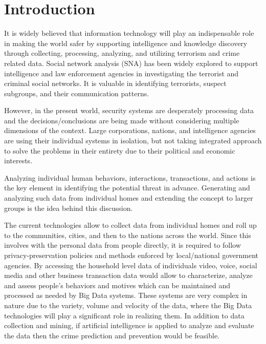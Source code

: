 \documentclass[sigconf]{acmart}
\begin{document}

\maketitle

\section{Introduction}
It is widely believed that information technology will play an indispensable role in making the world safer by supporting intelligence and knowledge discovery through collecting, processing, analyzing, and utilizing terrorism and crime related data\cite{Kantor2005}. Social network analysis (SNA) has been widely explored to support intelligence and law enforcement agencies in investigating the terrorist and criminal social networks. It is valuable in identifying terrorists, suspect subgroups, and their communication patterns.

However, in the present world, security systems are desperately processing data and the decisions/conclusions are being made without considering multiple dimensions of the context. Large corporations, nations, and intelligence agencies are using their individual systems in isolation, but not taking integrated approach to solve the problems in their entirety due to their political and economic interests.

Analyzing individual human behaviors, interactions, transactions, and actions is the key element in identifying the potential threat in advance. Generating and analyzing such data from individual homes and extending the concept to larger groups is the idea behind this discussion.

The current technologies allow to collect data from individual homes and roll up to the communities, cities, and then to the nations across the world. Since this involves with the personal data from people directly, it is required to follow privacy-preservation policies and methods enforced by local/national government agencies. By accessing the household level data of individuals video, voice, social media and other business transaction data would allow to characterize, analyze and assess people's behaviors and motives which can be maintained and processed as needed by Big Data systems. These systems are very complex in nature due to the variety, volume and velocity of the data, where the Big Data technologies will play a significant role in realizing them. In addition to data collection and mining, if artificial intelligence is applied to analyze and evaluate the data then the crime prediction and prevention would be feasible.
\end{document}
